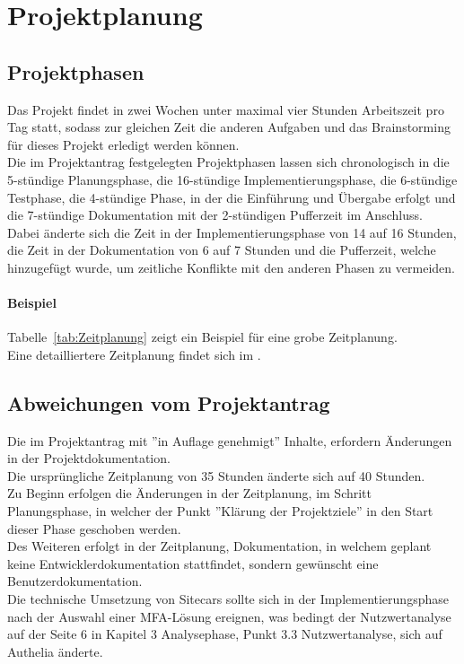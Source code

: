 \section{Projektplanung} 
\label{sec:Projektplanung}


\subsection{Projektphasen}
\label{sec:Projektphasen}

Das Projekt findet in zwei Wochen unter maximal vier Stunden Arbeitszeit pro Tag statt, sodass zur gleichen 
Zeit die anderen Aufgaben und das Brainstorming für dieses Projekt erledigt werden können.
\\Die im Projektantrag festgelegten Projektphasen lassen sich chronologisch in die 5-stündige Planungsphase, 
die 16-stündige Implementierungsphase, die 6-stündige Testphase, die 4-stündige Phase, in der die 
Einführung und Übergabe erfolgt und die 7-stündige Dokumentation mit der 2-stündigen Pufferzeit im Anschluss.
\\Dabei änderte sich die Zeit in der Implementierungsphase von 14 auf 16 Stunden, die Zeit in der 
Dokumentation von 6 auf 7 Stunden und die Pufferzeit, welche hinzugefügt wurde, um zeitliche Konflikte mit 
den anderen Phasen zu vermeiden.

\paragraph{Beispiel}
Tabelle~\ref{tab:Zeitplanung} zeigt ein Beispiel für eine grobe Zeitplanung.
\\
Eine detailliertere Zeitplanung findet sich im .


\subsection{Abweichungen vom Projektantrag}
\label{sec:AbweichungenProjektantrag}

Die im Projektantrag mit ''in Auflage genehmigt'' Inhalte, erfordern Änderungen in der Projektdokumentation.
\\Die ursprüngliche Zeitplanung von 35 Stunden änderte sich auf 40 Stunden.
\\Zu Beginn erfolgen die Änderungen in der Zeitplanung, im Schritt Planungsphase, in welcher der Punkt ''Klärung der 
Projektziele'' in den Start dieser Phase geschoben werden.
\\Des Weiteren erfolgt in der Zeitplanung, Dokumentation, in welchem geplant keine Entwicklerdokumentation 
stattfindet, sondern gewünscht eine Benutzerdokumentation.
\\Die technische Umsetzung von Sitecars sollte sich in der Implementierungsphase nach der Auswahl einer MFA-Lösung 
ereignen, was bedingt der Nutzwertanalyse auf der Seite 6 in Kapitel 3 Analysephase, Punkt 3.3 Nutzwertanalyse, 
sich auf Authelia änderte.


